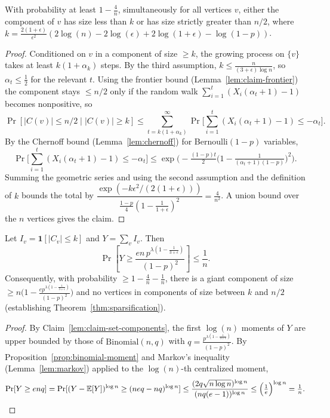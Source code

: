 \begin{lemma}
  \label{lem:claim-component-size}
  With probability at least $1 - \tfrac{4}{n}$, simultaneously for all vertices
  $v$, either the component of $v$ has size less than $k$ or has size strictly
  greater than $n/2$, where $k = \tfrac{2(1+\epsilon)}{\epsilon^2}
  (2\log(n) - 2\log(\epsilon) + 2\log(1+\epsilon) - \log(1-p))$.
\end{lemma}
\begin{proof}
  Conditioned on $v$ in a component of size $\ge k$, the growing process on
  $\{v\}$ takes at least $k(1+\alpha_k)$ steps. By the third assumption,
  $k \le \tfrac{n}{(3+\epsilon)\log n}$, so $\alpha_t \le \tfrac12$ for the
  relevant $t$. Using the frontier bound (Lemma~\ref{lem:claim-frontier}) the
  component stays $\le n/2$ only if the random walk
  $\sum_{i=1}^t(X_i(\alpha_t+1)-1)$ becomes nonpositive, so
  \[
    \Pr[|C(v)| \le n/2 \mid |C(v)| \ge k]
      \le \sum_{t = k(1+\alpha_k)}^{\infty}
        \Pr\Big[\sum_{i=1}^t(X_i(\alpha_t+1) - 1) \le -\alpha_t\Big].
  \]
  By the Chernoff bound (Lemma~\ref{lem:chernoff}) for Bernoulli$(1-p)$
  variables,
  \[
    \Pr\Big[\sum_{i=1}^t(X_i(\alpha_t+1)-1) \le -\alpha_t\Big]
      \le \exp\!\Big(-\tfrac{(1-p)t}{2}\big(1 - \tfrac{1}{(\alpha_t+1)(1-p)}\big)^2\Big).
  \]
  Summing the geometric series and using the second assumption and the definition
  of $k$ bounds the total by
  $\dfrac{\exp(-k\epsilon^2/(2(1+\epsilon)))}{\frac{1-p}{4}(1-\frac{1}{1+\epsilon})^2}
    = \tfrac{4}{n^2}$. A union bound over the $n$ vertices gives the claim.
\end{proof}

\begin{lemma}
  \label{lem:claim-small-components}
  Let $I_v = \mathbf{1}[|C_v| \le k]$ and $Y = \sum_v I_v$. Then
  \[
    \Pr\!\left[Y \ge \frac{en\, p^{\lambda(1-\frac{1}{3+\epsilon})}}{(1-p)^2}\right]
      \le \frac{1}{n}.
  \]
  Consequently, with probability $\ge 1 - \tfrac{4}{n} - \tfrac1n$, there is a
  giant component of size
  $\ge n\big(1 - \tfrac{e p^{\lambda(1-\frac{1}{3+\epsilon})}}{(1-p)^2}\big)$ and
  no vertices in components of size between $k$ and $n/2$ (establishing
  Theorem~\ref{thm:sparsification}).
\end{lemma}
\begin{proof}
  By Claim~\ref{lem:claim-set-components}, the first $\log(n)$ moments of $Y$ are
  upper bounded by those of $\mathrm{Binomial}(n,q)$ with
  $q = \tfrac{p^{\lambda(1-\frac{1}{3+\epsilon})}}{(1-p)^2}$. By
  Proposition~\ref{prop:binomial-moment} and Markov's inequality
  (Lemma~\ref{lem:markov}) applied to the $\log(n)$-th centralized moment,
  \[
    \Pr[Y \ge enq]
      = \Pr[(Y - \mathbb{E}[Y])^{\log n} \ge (neq - nq)^{\log n}]
      \le \frac{(2q\sqrt{n\log n})^{\log n}}{(nq(e-1))^{\log n}}
      \le \Big(\tfrac1e\Big)^{\log n} = \tfrac1n . \qedhere
  \]
\end{proof}

